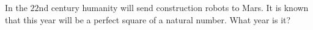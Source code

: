 In the $22$nd century humanity will send construction robots to Mars. It is known that this year will be a perfect square of a natural number. What year is it?
